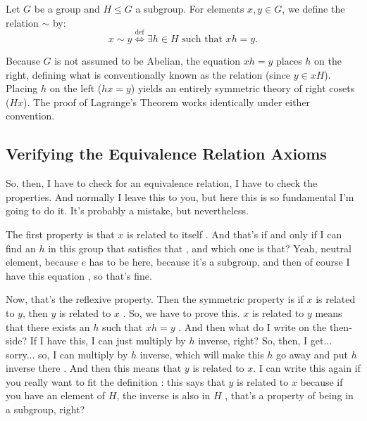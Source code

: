 \begin{content}
Let $G$ be a group and $H \le G$ a subgroup. For elements $x, y \in G$, we define the relation $\sim$ by:
\begin{equation}\label{eq:coset-equiv-relation}
x \sim y \stackrel{\text{def}}{\iff} \exists h \in H \text{ such that } xh = y.
\end{equation}

\begin{steps}
Because $G$ is not assumed to be Abelian, the equation $xh = y$ places $h$ on the right, defining what is conventionally known as the  relation (since $y \in xH$). Placing $h$ on the left ($hx = y$) yields an entirely symmetric theory of right cosets ($Hx$). The proof of Lagrange's Theorem works identically under either convention.
\end{steps}
\end{content}

\subsection{Verifying the Equivalence Relation Axioms}

\begin{speech}[00:16:00 - 00:17:28]
So, then, I have to check for an equivalence relation, I have to check the properties. And normally I leave this to you, but here this is so fundamental I'm going to do it. It's probably a mistake, but nevertheless.

The first property is that $x$ is related to itself . And that's if and only if I can find an $h$ in this group that satisfies that , and which one is that? Yeah, neutral element, because $e$ has to be here, because it's a subgroup, and then of course I have this equation , so that's fine.

Now, that's the reflexive property. Then the symmetric property is if $x$ is related to $y$, then $y$ is related to $x$ . So, we have to prove this. $x$ is related to $y$ means that there exists an $h$ such that $xh = y$ . And then what do I write on the then-side? If I have this, I can just multiply by $h$ inverse, right? So, then, I get... sorry... so, I can multiply by $h$ inverse, which will make this $h$ go away and put $h$ inverse there . And then this means that $y$ is related to $x$. I can write this again if you really want to fit the definition : this says that $y$ is related to $x$ because if you have an element of $H$, the inverse is also in $H$ , that's a property of being in a subgroup, right?
\end{speech}

